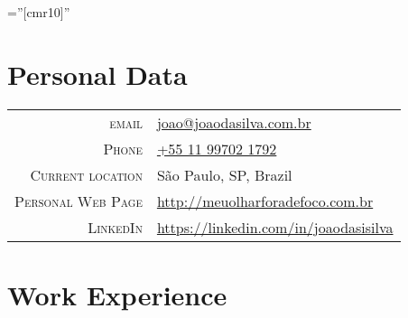 \documentclass[a4paper,10pt]{article} %
\begin{document}
\pagestyle{empty} %

\font\fb=''[cmr10]'' %


\par{\bigskip\par} %

\section{Personal Data}

\begin{tabular}{rl}
\textsc{email} & \href{mailto:joao@joaodasilva.com.br}{joao@joaodasilva.com.br}\\
\textsc{Phone} & \href{tel:+5511997021792}{+55 11 99702 1792}\\
\textsc{Current location} & São Paulo, SP, Brazil\\

\textsc{Personal Web Page} & \href{http://meuolharforadefoco.com.br}{http://meuolharforadefoco.com.br}\\
\textsc{LinkedIn} & \href{https://linkedin.com/in/joaodasisilva}{https://linkedin.com/in/joaodasisilva}\\

\end{tabular}



\section{Work Experience}
\end{document}
